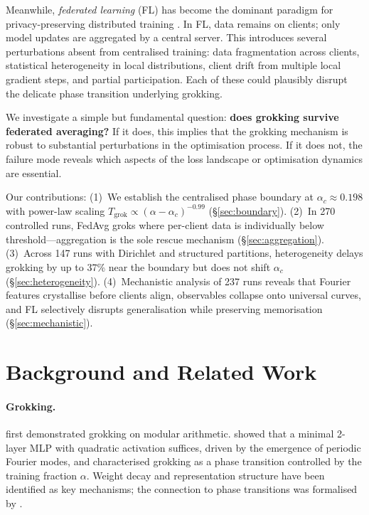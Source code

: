 \documentclass{article}
\begin{document}
Meanwhile, \emph{federated learning} (FL) has become the dominant paradigm for privacy-preserving distributed training \citep{mcmahan2017communication, kairouz2021advances}.
In FL, data remains on clients; only model updates are aggregated by a central server.
This introduces several perturbations absent from centralised training: data fragmentation across clients, statistical heterogeneity in local distributions, client drift from multiple local gradient steps, and partial participation.
Each of these could plausibly disrupt the delicate phase transition underlying grokking.

We investigate a simple but fundamental question: \textbf{does grokking survive federated averaging?}
If it does, this implies that the grokking mechanism is robust to substantial perturbations in the optimisation process.
If it does not, the failure mode reveals which aspects of the loss landscape or optimisation dynamics are essential.

Our contributions: (1)~We establish the centralised phase boundary at $\alpha_c \approx 0.198$ with power-law scaling $T_{\mathrm{grok}} \propto (\alpha - \alpha_c)^{-0.99}$ (\S\ref{sec:boundary}).
(2)~In 270 controlled runs, FedAvg groks where per-client data is individually below threshold---aggregation is the sole rescue mechanism (\S\ref{sec:aggregation}).
(3)~Across 147 runs with Dirichlet and structured partitions, heterogeneity delays grokking by up to 37\% near the boundary but does not shift $\alpha_c$ (\S\ref{sec:heterogeneity}).
(4)~Mechanistic analysis of 237 runs reveals that Fourier features crystallise before clients align, observables collapse onto universal curves, and FL selectively disrupts generalisation while preserving memorisation (\S\ref{sec:mechanistic}).


\section{Background and Related Work}
\label{sec:background}

\paragraph{Grokking.}
\citet{power2022grokking} first demonstrated grokking on modular arithmetic.
\citet{gromov2023grokking} showed that a minimal 2-layer MLP with quadratic activation suffices, driven by the emergence of periodic Fourier modes, and characterised grokking as a phase transition controlled by the training fraction $\alpha$.
Weight decay \citep{liu2022omnigrok} and representation structure \citep{nanda2023progress} have been identified as key mechanisms; the connection to phase transitions was formalised by \citet{thilak2022slingshot}.
\end{document}
